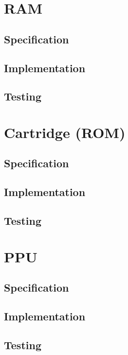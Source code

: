 \documentclass[]{report}
\begin{document}
\section{RAM}

\subsection{Specification}



\subsection{Implementation}

\subsection{Testing}

\section{Cartridge (ROM)}

\subsection{Specification}

\subsection{Implementation}

\subsection{Testing}



\section{PPU}

\subsection{Specification}



\subsection{Implementation}

\subsection{Testing}
\end{document}
